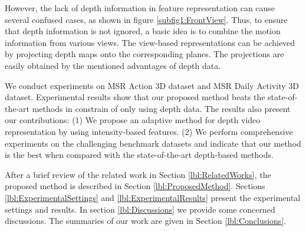 \documentclass[review]{elsarticle}
\begin{document}
However, the lack of depth information in feature representation can cause several confused cases, as shown in figure \ref{subfig1:FrontView}. Thus, to ensure that depth information is not ignored, a basic idea is to combine the motion information from various views. The view-based representations can be achieved by projecting depth maps onto the corresponding planes. The projections are easily obtained by the mentioned advantages of depth data.

We conduct experiments on MSR Action 3D dataset and MSR Daily Activity 3D dataset. Experimental results show that our proposed method beats the state-of-the-art methods in constrain of only using depth data. The results also present our contributions: (1) We propose an adaptive method for depth video representation by using intensity-based features. (2) We perform comprehensive experiments on the challenging benchmark datasets and indicate that our method is the best when compared with the state-of-the-art depth-based methods.

After a brief review of the related work in Section \ref{lbl:RelatedWorks}, the proposed method is described in Section \ref{lbl:ProposedMethod}. Sections \ref{lbl:ExperimentalSettings} and \ref{lbl:ExperimentalResults} present the experimental settings and results. In section \ref{lbl:Discussions} we provide some concerned discussions. The summaries of our work are given in Section \ref{lbl:Conclusions}.

\end{document}
